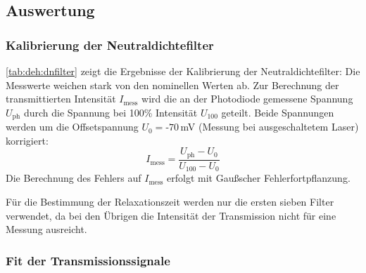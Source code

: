 \subsection{Auswertung}

\subsubsection*{Kalibrierung der Neutraldichtefilter}

\autoref{tab:deh:dnfilter} zeigt die Ergebnisse der Kalibrierung der Neutraldichtefilter:
Die Messwerte weichen stark von den nominellen Werten ab.
Zur Berechnung der transmittierten Intensität $I_\text{mess}$ wird
die an der Photodiode gemessene Spannung $U_{\text{ph}}$
durch die Spannung bei 100\% Intensität $U_{100}$ geteilt.
Beide Spannungen werden um die Offsetspannung $U_{0}=\text{-}70\,$mV (Messung bei ausgeschaltetem Laser) korrigiert:
\begin{equation}
  I_\text{mess}=\frac{U_{\text{ph}}-U_{0}}{U_{100}-U_{0}}
\end{equation}
Die Berechnung des Fehlers auf $I_\text{mess}$ erfolgt mit Gaußscher Fehlerfortpflanzung.

Für die Bestimmung der Relaxationszeit werden nur die ersten sieben Filter verwendet,
da bei den Übrigen die Intensität der Transmission nicht für eine Messung ausreicht.\\





\subsubsection*{Fit der Transmissionssignale}

